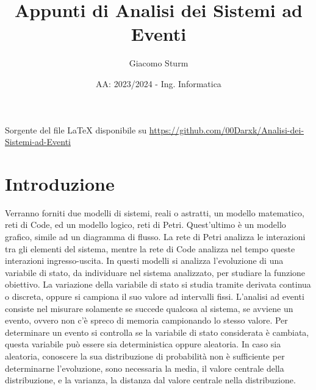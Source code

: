 \documentclass{article}
\title{Appunti di Analisi dei Sistemi ad Eventi}
\author{Giacomo Sturm}
\date{AA: 2023/2024 - Ing. Informatica}
\numberwithin{equation}{subsection}
\begin{document}

\pagestyle{fancy}
\fancyhead{}\fancyfoot{}
\fancyfoot[C]{\thepage}

\maketitle

\vspace{10mm}

\begin{center}
    Sorgente del file LaTeX disponibile su \url{https://github.com/00Darxk/Analisi-dei-Sistemi-ad-Eventi}
\end{center}

\clearpage

\tableofcontents

\clearpage


\section{Introduzione}

Verranno forniti due modelli di sistemi, reali o astratti, un modello matematico, reti di Code, ed un modello logico, reti di Petri. Quest'ultimo è un modello grafico, simile ad 
un diagramma di flusso. La rete di Petri analizza le interazioni tra gli elementi del sistema, mentre la rete di Code analizza nel tempo queste interazioni ingresso-uscita. 
In questi modelli si analizza l'evoluzione di una variabile di stato, da individuare nel sistema analizzato, per studiare la funzione obiettivo. La variazione della variabile 
di stato si studia tramite derivata continua o discreta, oppure si campiona il suo valore ad intervalli fissi. L'analisi ad eventi consiste nel misurare solamente se succede 
qualcosa al sistema, se avviene un evento, ovvero non c'è spreco di memoria campionando lo stesso valore. Per determinare un evento si controlla se la variabile di stato 
considerata è cambiata, questa variabile può essere sia deterministica oppure aleatoria. In caso sia aleatoria, conoscere la sua distribuzione di probabilità non è sufficiente 
per determinarne l'evoluzione, sono necessaria la media, il valore centrale della distribuzione, e la varianza, la distanza dal valore centrale nella distribuzione. 
\end{document}
